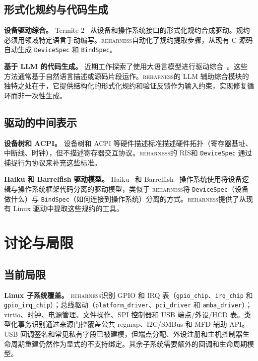 \documentclass[sigplan, screen, review, anonymous]{acmart}
\newcommand{\reharness}{\textsc{reharness}}
\newcommand{\rislang}{RIS}
\begin{document}
\subsection{形式化规约与代码生成}

\textbf{设备驱动综合。} Termite-2~\cite{ryzhyk2014termite2} 从设备和操作系统接口的形式化规约合成驱动。规约必须用领域特定语言手动编写。\reharness 自动化了规约提取步骤，从现有 C 源码自动生成 \texttt{DeviceSpec} 和 \texttt{BindSpec}。

\textbf{基于 LLM 的代码生成。} 近期工作探索了使用大语言模型进行驱动综合~\cite{roelofs2023large}。这些方法通常基于自然语言描述或源码片段运作。\reharness 的 LLM 辅助综合模块的独特之处在于，它提供结构化的形式化规约和验证反馈作为输入约束，实现修复循环而非一次性生成。

\subsection{驱动的中间表示}

\textbf{设备树和 ACPI。} 设备树和 ACPI 等硬件描述标准描述硬件拓扑（寄存器基址、中断线、时钟），但不描述寄存器交互协议。\reharness 的 \rislang 和 \texttt{DeviceSpec} 通过捕捉行为协议来补充这些标准。

\textbf{Haiku 和 Barrelfish 驱动模型。} Haiku~\cite{haiku} 和 Barrelfish~\cite{baumann2009multikernel} 操作系统使用将设备逻辑与操作系统框架代码分离的驱动模型，类似于 \reharness 将 \texttt{DeviceSpec}（设备做什么）与 \texttt{BindSpec}（如何连接到操作系统）分离的方式。\reharness 提供了从现有 Linux 驱动中提取这些规约的工具。

\section{讨论与局限}
\label{sec:discussion}

\subsection{当前局限}

\textbf{Linux 子系统覆盖。} \reharness 识别 GPIO 和 IRQ 表（\texttt{gpio\_chip}、\texttt{irq\_chip} 和 \texttt{gpio\_irq\_chip}）；总线驱动（\texttt{platform\_driver}、\texttt{pci\_driver} 和 \texttt{amba\_driver}）；virtio、时钟、电源管理、文件操作、SPI 控制器和 USB 端点/外设/HCD 表。类型化事务识别通过来源门控覆盖公共 regmap、I2C/SMBus 和 MFD 辅助 API。USB 回调签名和常见私有字段已被建模，但端点分配、外设注册和主机控制器生命周期重建仍然作为显式的不支持绑定。其余子系统需要额外的回调和生命周期模型。
\end{document}
